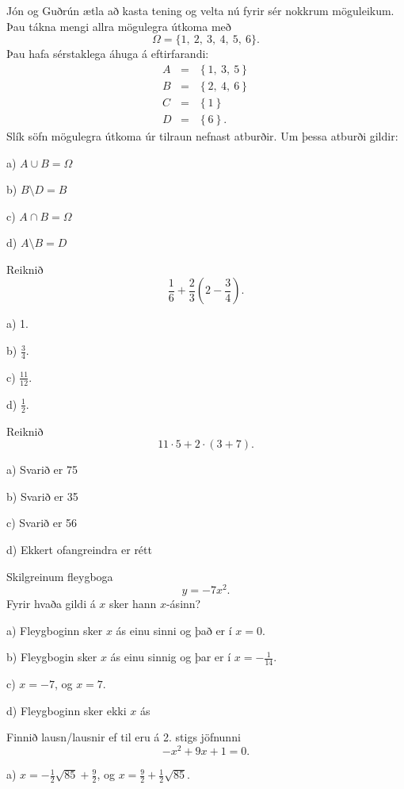 \item Jón og Guðrún ætla að kasta tening og velta nú fyrir sér nokkrum möguleikum. Þau tákna mengi  
allra mögulegra útkoma með 
$$ 
\Omega=\{1,\ 2,\ 3,\ 4,\ 5,\ 6\}. 
$$ 
Þau hafa sérstaklega áhuga á eftirfarandi: 
\begin{eqnarray*} 
A&=&\left \{ 1,\ 3,\ 5 \right \} \\ 
B&=&\left \{ 2,\ 4,\ 6  \right \} \\ 
C&=&\left \{ 1 \right \} \\ 
D&=&\left \{ 6 \right \}. 
\end{eqnarray*} 
Slík söfn mögulegra útkoma úr tilraun nefnast atburðir. Um þessa atburði gildir: 

a) $A\cup B=\Omega$
 
b) $B\setminus D=B $
 
c) $A\cap B=\Omega$

d) $A\setminus B=D$

\item Reiknið
\[
	\frac{1}{6} + \frac{2}{3} \left( 2 - \frac{3}{4} \right).
\]

a) 1.

b) $ \frac{3}{4}$.

c) $ \frac{11}{12}$.

d) $ \frac{1}{2}$.

\item Reiknið
$$
11 \cdot 5+2 \cdot  \left ( 3+7 \right ) .
$$
 
a) Svarið er 75
 
b) Svarið er 35
 
c) Svarið er 56
 
d) Ekkert ofangreindra er rétt

\newpage

\item Skilgreinum fleygboga $$y=- 7 x^{2}.$$ Fyrir hvaða gildi á $x$ sker hann $x$-ásinn?

a) Fleygboginn sker $x$ ás einu sinni og það er í $x=0$.

b) Fleygbogin sker $x$ ás einu sinnig og þar er í $x=- \frac{1}{14}$. 

c) $x=-7$, og $x=7$. 

d) Fleygboginn sker ekki $x$ ás


\item Finnið lausn/lausnir ef til eru á 2. stigs jöfnunni $$- x^{2} + 9 x + 1=0.$$

a) $x = - \frac{1}{2} \sqrt{85} + \frac{9}{2}$, og $x=\frac{9}{2} + \frac{1}{2} \sqrt{85}$. 

